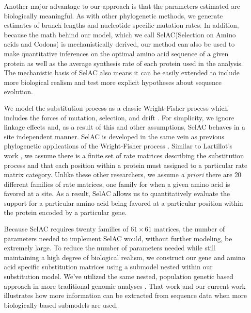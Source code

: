 \documentclass{article}
\newcommand{\selac}{SelAC\xspace}
\begin{document}
Another major advantage to our approach is that the parameters estimated are biologically meaningful.
As with other phylogenetic methods,  we generate estimates of branch lengths and nucleotide specific mutation rates.
In addition, because the math behind our model, which we call \selac (Selection on Amino acids and Codons) is mechanistically derived, our method can also be used to make quantitative inferences on the optimal amino acid sequence of a given protein as well as the average synthesis rate of each protein used in the analysis.
The mechanistic basis of \selac also means it can be easily extended to include more biological realism and test more explicit hypotheses about sequence evolution.

We model the substitution process as a classic Wright-Fisher process which includes the forces of mutation, selection, and drift \citep{Fisher1930,Kimura1962,Wright1969,Iwasa1988,BergAndLassig2003,SellaAndHirsh2005,McCandlishAndStoltzfus2014}.
For simplicity, we ignore linkage effects and, as a result of this and other assumptions, \selac behaves in a site independent manner.
\selac is developed in the same vein as previous phylogenetic applications of the Wright-Fisher process \citep[e.g.][]{MuseAndGaut1994,HalpernAndBruno1998,YangAndNielsen2008,RodrigueEtAl2005,KoshiAndGoldstein1997,KoshiEtAl1999,DimmicEtAl2000,ThorneEtAl2012,LartillotAndPhilippe2004,RodrigueAndLartillot2014}.
Similar to Lartillot's work \citep{LartillotAndPhilippe2004,RodrigueAndLartillot2014}, we assume there is a finite set of rate matrices describing the substitution process and that each position within a protein must assigned to a particular rate matrix category.
Unlike these other researchers, we assume \emph{a priori} there are 20 different families of rate matrices, one family for when a given amino acid is favored at a site.
As a result, \selac allows us to quantitatively evaluate the support for a particular amino acid being favored at a particular position within the protein encoded by a particular gene.

Because \selac requires twenty families of $61 \times 61$ matrices, the number of parameters needed to implement \selac would, without further modeling, be extremely large.
To reduce the number of parameters needed while still maintaining a high degree of biological realism, we construct our gene and amino acid specific substitution matrices using a submodel nested within our substitution model.
We've utilized the same nested, population genetic based approach in more traditional genomic analyses \citep[e.g.][]{Gilchrist2007,ShahAndGilchrist2011,GilchristEtAl2015}.
That work and our current work illustrates how more information can be extracted from sequence data when more biologically based submodels are used.
\end{document}
